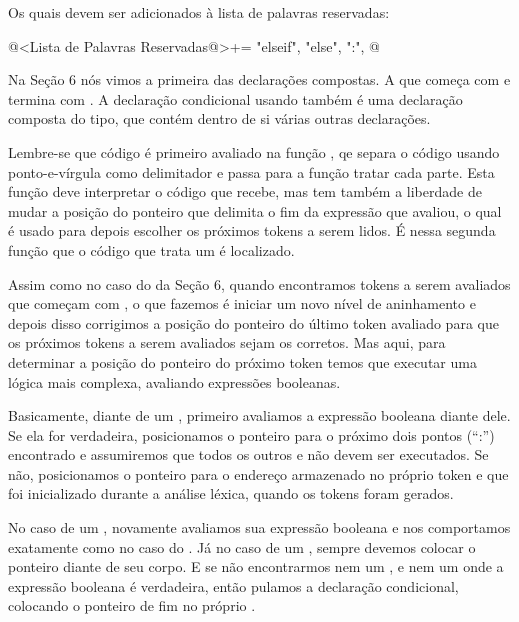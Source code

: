 {{{{{{Os quais devem ser adicionados à lista de palavras reservadas:

\iniciocodigo
@<Lista de Palavras Reservadas@>+=
"elseif", "else", ":",
@
\fimcodigo

Na Seção 6 nós vimos a primeira das declarações compostas. A que
começa com  e termina
com . A declaração condicional
usando  também é uma declaração composta do tipo, que
contém dentro de si várias outras declarações.

Lembre-se que código é primeiro avaliado na
função , qe separa o código
usando ponto-e-vírgula como delimitador e passa para a
função  tratar cada parte. Esta função
deve interpretar o código que recebe, mas tem também a liberdade de
mudar a posição do ponteiro que delimita o fim da expressão que
avaliou, o qual é usado para depois escolher os próximos tokens a
serem lidos. É nessa segunda função que o código que trata
um  é localizado.

Assim como no caso do  da Seção 6,
quando encontramos tokens a serem avaliados que começam
com , o que fazemos é iniciar um novo nível de
aninhamento e depois disso corrigimos a posição do ponteiro do último
token avaliado para que os próximos tokens a serem avaliados sejam os
corretos. Mas aqui, para determinar a posição do ponteiro do próximo
token temos que executar uma lógica mais complexa, avaliando
expressões booleanas.

Basicamente, diante de um , primeiro avaliamos a
expressão booleana diante dele. Se ela for verdadeira, posicionamos o
ponteiro para o próximo dois pontos (``:'') encontrado e assumiremos
que todos os outros  e  não devem
ser executados. Se não, posicionamos o ponteiro para o endereço
armazenado no próprio token  e que foi inicializado
durante a análise léxica, quando os tokens foram gerados.

No caso de um , novamente avaliamos sua expressão
booleana e nos comportamos exatamente como no caso
do . Já no caso de um , sempre devemos
colocar o ponteiro diante de seu corpo. E se não encontrarmos nem
um , e nem um  onde a expressão
booleana é verdadeira, então pulamos a declaração condicional,
colocando o ponteiro de fim no próprio .

}}}}}}

